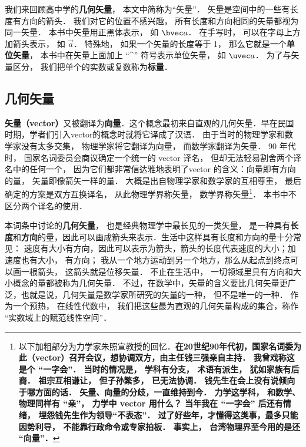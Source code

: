 
我们来回顾高中学的\textbf{几何矢量}， 本文中简称为“矢量”． 矢量是空间中的一些有长度有方向的箭头． 我们对它的位置不感兴趣， 所有长度和方向相同的矢量都视为同一矢量． 本书中矢量用正黑体表示， 如 $\bvec a$． 在手写时， 可以在字母上方加箭头表示， 如 $\overrightarrow{a}$． 特殊地， 如果一个矢量的长度等于 1， 那么它就是一个\textbf{单位矢量}， 本书中在矢量上面加上 “\^{}” 符号表示单位矢量， 如 $\uvec a$． 为了与矢量区分， 我们把单个的实数或复数称为\textbf{标量}．

\subsection{几何矢量}

\textbf{矢量（vector）}又被翻译为\textbf{向量}．这个概念最初来自直观的几何矢量．早在民国时期，学者们引入vector的概念时就将它译成了汉语． 由于当时的物理学家和数学家没有太多交集， 物理学家将它翻译为向量， 而数学家翻译为矢量． 90 年代时， 国家名词委员会商议确定一个统一的 vector 译名， 但却无法轻易割舍两个译名中的任何一个， 因为它们都非常信达雅地表明了vector 的含义：向量即有方向的量， 矢量即像箭矢一样的量． 大概是出自物理学家和数学家的互相尊重， 最后确定的方案是双方互换译名， 从此物理学界称矢量， 数学界称矢量\footnote{以下加粗部分为力学家朱照宣教授的回忆．\textbf{在20世纪90年代初，国家名词委为此（vector）召开会议，想协调双方，由主任钱三强亲自主持． 我曾戏称这是个 “一字会”． 当时的情况是， 学科有分支， 术语有派生， 犹如家族有后裔． 祖宗互相谦让， 但子孙繁多， 已无法协调． 钱先生在会上没有说倾向于哪方面的话． 矢量、向量的分歧，一直维持到今． 力学这学科， 和数学、物理同样有 “亲”， 力学中 vector 用什么？ 当年我在 “一字会” 后还有情绪， 埋怨钱先生作为领导“不表态”． 过了好些年，才懂得这类事，最多只能因势利导， 不能靠行政命令或专家拍板． 事实上， 台湾物理界至今用的是还 “向量”．}}． 本书中不区分两个译名的使用．

本词条中讨论的\textbf{几何矢量}， 也是经典物理学中最长见的一类矢量， 是一种具有\textbf{长度}和\textbf{方向}的量，因此可以画成箭头来表示．生活中这样具有长度和方向的量十分常见： 速度有大小有方向，因此可以表示为箭头，箭头的长度代表速度的大小；加速度也有大小， 有方向； 我从一个地方运动到另一个地方，那么从起点到终点可以画一根箭头， 这箭头就是位移矢量． 不止在生活中， 一切领域里具有方向和大小概念的量都被称为几何矢量． 不过，在数学中，矢量的含义要比几何矢量更广泛，也就是说，几何矢量是数学家所研究的矢量的一种， 但不是唯一的一种． 作为一个预热， 在线性代数中， 我们把这些最为直观的几何矢量构成的集合，称作 “实数域上的赋范线性空间”．

